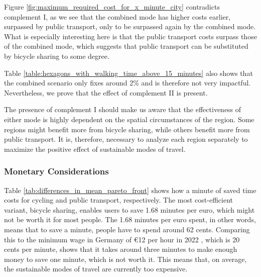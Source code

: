 Figure \ref{fig:maximum_required_cost_for_x_minute_city} contradicts complement I, as we see that the combined mode has higher costs earlier, surpassed by public transport, only to be surpassed again by the combined mode.
What is especially interesting here is that the public transport costs surpass those of the combined mode, which suggests that public transport can be substituted by bicycle sharing to some degree.



Table \ref{table:hexagons_with_walking_time_above_15_minutes} also shows that the combined scenario only fixes around 2\% and is therefore not very impactful.
Nevertheless, we prove that the effect of complement II is present.


The presence of complement I should make us aware that the effectiveness of either mode is highly dependent on the spatial circumstances of the region.
Some regions might benefit more from bicycle sharing, while others benefit more from public transport.
It is, therefore, necessary to analyze each region separately to maximize the positive effect of sustainable modes of travel.





\subsubsection{Monetary Considerations}

Table \ref{tab:differences_in_mean_pareto_front} shows how a minute of saved time costs for cycling and public transport, respectively.
The most cost-efficient variant, bicycle sharing, enables users to save 1.68 minutes per euro, which might not be worth it for most people.
The 1.68 minutes per euro spent, in other words, means that to save a minute, people have to spend around 62 cents.
Comparing this to the minimum wage in Germany of \euro{12} per hour in 2022 , which is 20 cents per minute, shows that it takes around three minutes to make enough money to save one minute, which is not worth it.
This means that, on average, the sustainable modes of travel are currently too expensive.

